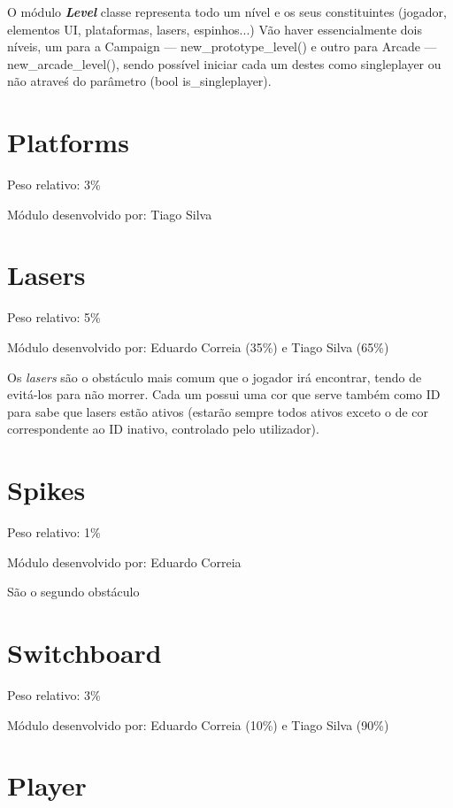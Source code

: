 \documentclass{report}
\begin{document}
O módulo \textbf{\textit{Level}} classe representa todo um nível e os seus constituintes (jogador, elementos UI, plataformas, lasers, espinhos...)
Vão haver essencialmente dois níveis, um para a Campaign --- new\_prototype\_level() e outro para Arcade --- new\_arcade\_level(), sendo possível iniciar cada um destes como singleplayer ou não atraveś do parâmetro (bool is\_singleplayer).

\section{Platforms}

Peso relativo: 3\%

Módulo desenvolvido por: Tiago Silva
\newline

\section{Lasers}

Peso relativo: 5\%

Módulo desenvolvido por: Eduardo Correia (35\%) e Tiago Silva (65\%)
\newline

Os \textit{lasers} são o obstáculo mais comum que o jogador irá encontrar, tendo de evitá-los para não morrer. Cada um possui uma cor que serve também como ID para sabe que lasers estão ativos (estarão sempre todos ativos exceto o de cor correspondente ao ID inativo, controlado pelo utilizador).

\section{Spikes}

Peso relativo: 1\%

Módulo desenvolvido por: Eduardo Correia
\newline

São o segundo obstáculo 

\section{Switchboard}

Peso relativo: 3\%

Módulo desenvolvido por: Eduardo Correia (10\%) e Tiago Silva (90\%)
\newline

\section{Player}
\end{document}
